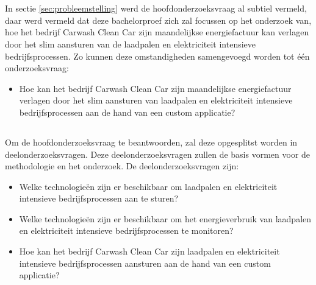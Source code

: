 \section{}%
\label{sec:onderzoeksvraag}

\subsection{}
\label{subsec:hoofdonderzoeksvraag}

In sectie \ref{sec:probleemstelling} werd de hoofdonderzoeksvraag al subtiel vermeld, daar werd vermeld dat deze bachelorproef zich zal focussen op het onderzoek van, hoe het bedrijf Carwash Clean Car zijn maandelijkse energiefactuur kan verlagen door het slim aansturen van de laadpalen en elektriciteit intensieve bedrijfsprocessen. Zo kunnen deze omstandigheden samengevoegd worden tot één onderzoeksvraag:

\begin{itemize}
  \item Hoe kan het bedrijf Carwash Clean Car zijn maandelijkse energiefactuur verlagen door het slim aansturen van laadpalen en elektriciteit intensieve bedrijfsprocessen aan de hand van een custom applicatie?
\end{itemize}

\subsection{}
\label{subsec:deelonderzoeksvragen}

Om de hoofdonderzoeksvraag te beantwoorden, zal deze opgesplitst worden in deelonderzoeksvragen. Deze deelonderzoeksvragen zullen de basis vormen voor de methodologie en het onderzoek. De deelonderzoeksvragen zijn:

\begin{itemize}
  \item Welke technologieën zijn er beschikbaar om laadpalen en elektriciteit intensieve bedrijfsprocessen aan te sturen?
  \item Welke technologieën zijn er beschikbaar om het energieverbruik van laadpalen en elektriciteit intensieve bedrijfsprocessen te monitoren?
  \item Hoe kan het bedrijf Carwash Clean Car zijn laadpalen en elektriciteit intensieve bedrijfsprocessen aansturen aan de hand van een custom applicatie?
\end{itemize}

